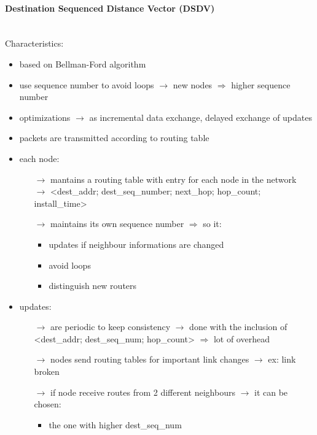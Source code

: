 \paragraph{Destination Sequenced Distance Vector (DSDV)}\mbox{}\\[0.2cm]
Characteristics:
\begin{itemize}
    \item based on Bellman-Ford algorithm
    \item use sequence number to avoid loops $\rightarrow$ new nodes $\Rightarrow$ higher sequence \mbox{number}
    \item optimizations $\rightarrow$ as incremental data exchange, delayed exchange of updates
    \item packets are transmitted according to routing table
    \item each node:
    \begin{itemize}
        \item[$\rightarrow$] mantains a routing table with entry for each node in the network\\
        $\rightarrow$ <dest\_addr; dest\_seq\_number; next\_hop; hop\_count; install\_time>
        \item[$\rightarrow$] maintains its own sequence number $\Rightarrow$ so it:
        \begin{itemize}
            \item updates if neighbour informations are changed
            \item avoid loops
            \item distinguish new routers
        \end{itemize}
    \end{itemize}
    \item updates:
    \begin{itemize}
        \item[$\rightarrow$] are periodic to keep consistency $\rightarrow$ done with the inclusion of\\<dest\_addr; dest\_seq\_num; hop\_count> $\Rightarrow$ lot of overhead
        \item[$\rightarrow$] nodes send routing tables for important link changes $\rightarrow$ ex: link broken
        \item[$\rightarrow$] if node receive routes from 2 different neighbours $\rightarrow$ it can be chosen:
        \begin{itemize}
            \item the one with higher dest\_seq\_num

\end{itemize}
\end{itemize}
\end{itemize}
